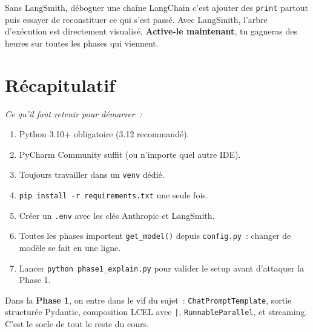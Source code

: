 \documentclass[11pt,a4paper]{article}
\begin{document}
\begin{tcolorbox}[title=LangSmith change la donne]
Sans LangSmith, déboguer une chaîne LangChain c'est ajouter des
\texttt{print} partout puis essayer de reconstituer ce qui s'est
passé. Avec LangSmith, l'arbre d'exécution est directement
visualisé. \textbf{Active-le maintenant}, tu gagneras des heures sur
toutes les phases qui viennent.
\end{tcolorbox}

\section*{Récapitulatif}


{\itshape\sloppy
\textit{Ce qu'il faut retenir pour démarrer~:}
\begin{enumerate}[leftmargin=*]
  \item Python 3.10+ obligatoire (3.12 recommandé).
  \item PyCharm Community suffit (ou n'importe quel autre IDE).
  \item Toujours travailler dans un \texttt{venv} dédié.
  \item \texttt{pip install -r requirements.txt} une seule fois.
  \item Créer un \texttt{.env} avec les clés Anthropic et LangSmith.
  \item Toutes les phases importent \texttt{get\_model()} depuis
        \texttt{config.py}~: changer de modèle se fait en une ligne.
  \item Lancer \texttt{python phase1\_explain.py} pour valider le
        setup avant d'attaquer la Phase 1.
\end{enumerate}
\par}

\bigskip

\begin{tcolorbox}[colback=green!4, colframe=green!50!black,
                  title=Prêt~? Direction la Phase 1]
Dans la \textbf{Phase 1}, on entre dans le vif du sujet~:
\texttt{ChatPromptTemplate}, sortie structurée Pydantic,
composition LCEL avec \texttt{|}, \texttt{RunnableParallel}, et
streaming. C'est le socle de tout le reste du cours.
\end{tcolorbox}
\end{document}
